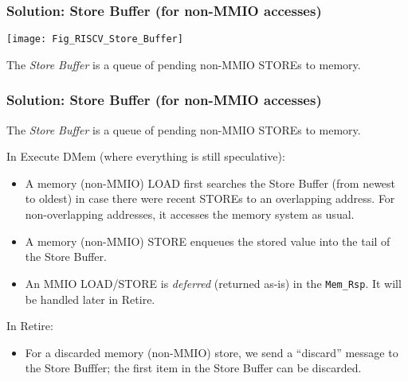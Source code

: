 
\begin{frame}[fragile]
\frametitle{Solution: Store Buffer (for non-MMIO accesses)}

\footnotesize

\begin{center}
 \texttt{[image: Fig\_RISCV\_Store\_Buffer]}
\end{center}

The \emph{Store Buffer} is a queue of pending non-MMIO STOREs to memory.

\end{frame}


\begin{frame}[fragile]
\frametitle{Solution: Store Buffer (for non-MMIO accesses)}

\footnotesize

The \emph{Store Buffer} is a queue of pending non-MMIO STOREs to memory.

\vspace{2ex}

In Execute DMem (where everything is still speculative):

\begin{itemize}

  \item A memory (non-MMIO) LOAD first searches the Store Buffer (from
        newest to oldest) in case there were recent STOREs to an
        overlapping address.  For non-overlapping addresses, it
        accesses the memory system as usual.

  \item A memory (non-MMIO) STORE enqueues the stored value into the
        tail of the Store Buffer.

  \item An MMIO LOAD/STORE is \emph{deferred} (returned as-is) in the
        {\tt Mem\_Rsp}.  It will be handled later in Retire.

\end{itemize}

\vspace{2ex}

In Retire:

\begin{itemize}

  \item For a discarded memory (non-MMIO) store, we send a ``discard''
        message to the Store Bufffer; the first item in the Store
        Buffer can be discarded.


\end{itemize}
\end{frame}

